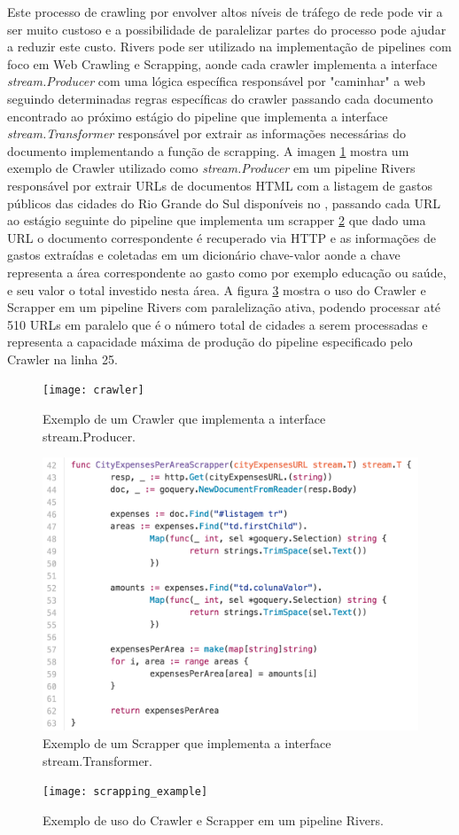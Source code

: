 Este processo de crawling por envolver altos níveis de tráfego de rede pode vir a ser muito custoso e a possibilidade de paralelizar partes do processo pode ajudar a reduzir este custo. Rivers pode ser utilizado na implementação de pipelines com foco em Web Crawling e Scrapping, aonde cada crawler implementa a interface \emph{stream.Producer} com uma lógica específica responsável por "caminhar" a web seguindo determinadas regras específicas do crawler passando cada documento encontrado ao próximo estágio do pipeline que implementa a interface \emph{stream.Transformer} responsável por extrair as informações necessárias do documento implementando a função de scrapping. A imagen \ref{code:crawler} mostra um exemplo de Crawler utilizado como \emph{stream.Producer} em um pipeline Rivers responsável por extrair URLs de documentos HTML com a listagem de gastos públicos das cidades do Rio Grande do Sul disponíveis no \cite{portal_transparencia}, passando cada URL ao estágio seguinte do pipeline que implementa um scrapper \ref{code:scrapper} que dado uma URL o documento correspondente é recuperado via HTTP e as informações de gastos extraídas e coletadas em um dicionário chave-valor aonde a chave representa a área correspondente ao gasto como por exemplo educação ou saúde, e seu valor o total investido nesta área. A figura \ref{code:scrapping_example} mostra o uso do Crawler e Scrapper em um pipeline Rivers com paralelização ativa, podendo processar até 510 URLs em paralelo que é o número total de cidades a serem processadas e representa a capacidade máxima de produção do pipeline especificado pelo Crawler na linha 25.

\begin{figure}[H]
  \texttt{[image: crawler]}
  \centering
  \caption{Exemplo de um Crawler que implementa a interface stream.Producer.}
  \label{code:crawler}
\end{figure}

\begin{figure}[H]
  \includegraphics[width=1\textwidth]{scrapper}
  \centering
  \caption{Exemplo de um Scrapper que implementa a interface stream.Transformer.}
  \label{code:scrapper}
\end{figure}

\begin{figure}[H]
  \texttt{[image: scrapping\_example]}
  \centering
  \caption{Exemplo de uso do Crawler e Scrapper em um pipeline Rivers.}
  \label{code:scrapping_example}
\end{figure}
